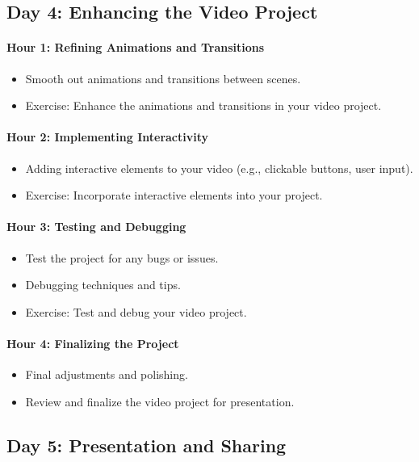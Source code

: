 \documentclass[main.tex]{subfiles}
\begin{document}
\subsection*{Day 4: Enhancing the Video Project}

\paragraph{Hour 1: Refining Animations and Transitions}
\begin{itemize}
  \item Smooth out animations and transitions between scenes.
  \item Exercise: Enhance the animations and transitions in your video project.
\end{itemize}

\paragraph{Hour 2: Implementing Interactivity}
\begin{itemize}
  \item Adding interactive elements to your video (e.g., clickable buttons, user input).
  \item Exercise: Incorporate interactive elements into your project.
\end{itemize}

\paragraph{Hour 3: Testing and Debugging}
\begin{itemize}
  \item Test the project for any bugs or issues.
  \item Debugging techniques and tips.
  \item Exercise: Test and debug your video project.
\end{itemize}

\paragraph{Hour 4: Finalizing the Project}
\begin{itemize}
  \item Final adjustments and polishing.
  \item Review and finalize the video project for presentation.
\end{itemize}

\subsection*{Day 5: Presentation and Sharing}
\end{document}
